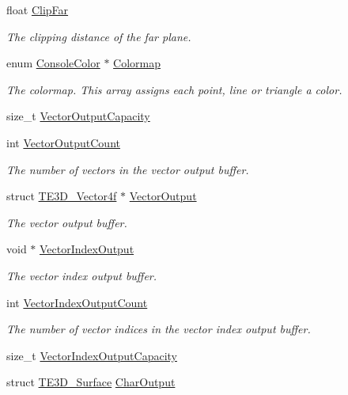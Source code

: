 \begin{DoxyCompactItemize}
float \hyperlink{struct_t_e3_d___pipeline_a5b41707833d27e2aff056a7ed6a0cb70}{Clip\-Far}
\begin{DoxyCompactList}\small\item\em The clipping distance of the far plane. \end{DoxyCompactList}\item 
enum \hyperlink{console_8h_a821042d5f30537f776ce823c5d66aada}{Console\-Color} $\ast$ \hyperlink{struct_t_e3_d___pipeline_a5a84db4451cdf0fbed35c8951455ac20}{Colormap}
\begin{DoxyCompactList}\small\item\em The colormap. This array assigns each point, line or triangle a color. \end{DoxyCompactList}\item 
size\-\_\-t \hyperlink{struct_t_e3_d___pipeline_a6372ef48448fcdf753e0ae30212feef6}{Vector\-Output\-Capacity}
\item 
int \hyperlink{struct_t_e3_d___pipeline_ae10862edd986d72d19291e85965282f6}{Vector\-Output\-Count}
\begin{DoxyCompactList}\small\item\em The number of vectors in the vector output buffer. \end{DoxyCompactList}\item 
struct \hyperlink{struct_t_e3_d___vector4f}{T\-E3\-D\-\_\-\-Vector4f} $\ast$ \hyperlink{struct_t_e3_d___pipeline_a484b514c3272f2ebd29fadb67c976cfb}{Vector\-Output}
\begin{DoxyCompactList}\small\item\em The vector output buffer. \end{DoxyCompactList}\item 
void $\ast$ \hyperlink{struct_t_e3_d___pipeline_ad8118d66dd301ae8c3c169705afc0096}{Vector\-Index\-Output}
\begin{DoxyCompactList}\small\item\em The vector index output buffer. \end{DoxyCompactList}\item 
int \hyperlink{struct_t_e3_d___pipeline_a26aaade63f941ff5fe6d8b310dc74c7f}{Vector\-Index\-Output\-Count}
\begin{DoxyCompactList}\small\item\em The number of vector indices in the vector index output buffer. \end{DoxyCompactList}\item 
size\-\_\-t \hyperlink{struct_t_e3_d___pipeline_affb87c7664521d942273fcc22a2b715f}{Vector\-Index\-Output\-Capacity}
\item 
struct \hyperlink{struct_t_e3_d___surface}{T\-E3\-D\-\_\-\-Surface} \hyperlink{struct_t_e3_d___pipeline_a4ccfa7cf1426da85d6f78d608c904ba4}{Char\-Output}
\end{DoxyCompactItemize}


